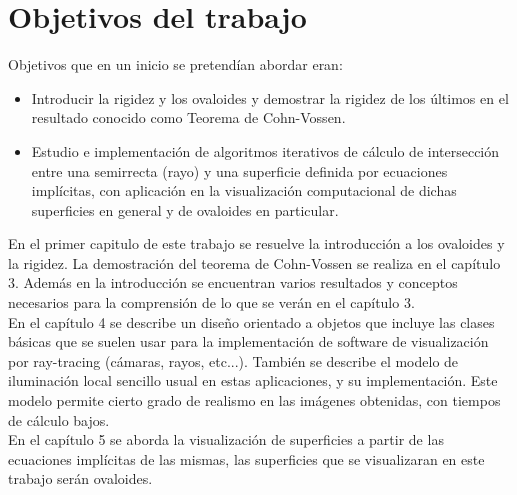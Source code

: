 \chapter{Objetivos del trabajo}

Objetivos que en un inicio se pretendían abordar eran:
\begin{itemize}
	\item Introducir la rigidez y los ovaloides y demostrar la rigidez de los últimos en el resultado conocido como Teorema de Cohn-Vossen.
	\item Estudio e implementación de algoritmos iterativos de cálculo de intersección entre una semirrecta (rayo) y una superficie definida por ecuaciones implícitas, con aplicación en la visualización computacional de dichas superficies en general y de ovaloides en particular.
\end{itemize}
${ }$\\

En el primer capitulo de este trabajo se resuelve la introducción a los ovaloides y la rigidez. La demostración del teorema de Cohn-Vossen se realiza en el capítulo 3. Además en la introducción se encuentran varios resultados y conceptos necesarios para la comprensión de lo que se verán en el capítulo 3.
${ }$\\

En el capítulo 4 se describe un diseño orientado a objetos que incluye las clases básicas que se suelen usar para la implementación de software de visualización por ray-tracing (cámaras, rayos, etc...). También se describe el modelo de iluminación local sencillo usual en estas aplicaciones, y su implementación. Este modelo permite cierto grado de realismo en las imágenes obtenidas, con tiempos de cálculo bajos.
${ }$\\

En el capítulo 5 se aborda la visualización de superficies a partir de las ecuaciones implícitas de las mismas, las superficies que se visualizaran en este trabajo serán ovaloides.
${ }$\\